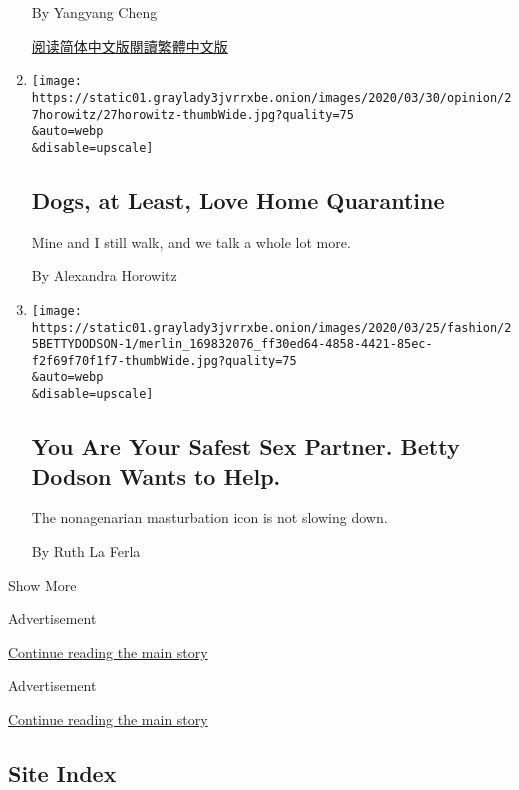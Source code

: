 \begin{enumerate}
  By Yangyang Cheng

  \href{https://cn.nytimes3xbfgragh.onion/opinion/20200410/coronavirus-china-us/}{阅读简体中文版}\href{https://cn.nytimes3xbfgragh.onion/opinion/20200410/coronavirus-china-us/zh-hant/}{閱讀繁體中文版}
\item
  \href{/2020/03/27/opinion/coronavirus-dogs.html}{}

  \texttt{[image: https://static01.graylady3jvrrxbe.onion/images/2020/03/30/opinion/27horowitz/27horowitz-thumbWide.jpg?quality=75\\\&auto=webp\\\&disable=upscale]}

  \hypertarget{dogs-at-least-love-home-quarantine}{%
  \subsection{Dogs, at Least, Love Home
  Quarantine}\label{dogs-at-least-love-home-quarantine}}

  Mine and I still walk, and we talk a whole lot more.

  By Alexandra Horowitz
\item
  \href{/2020/03/26/style/self-care/betty-dodson-masturbation.html}{}

  \texttt{[image: https://static01.graylady3jvrrxbe.onion/images/2020/03/25/fashion/25BETTYDODSON-1/merlin\_169832076\_ff30ed64-4858-4421-85ec-f2f69f70f1f7-thumbWide.jpg?quality=75\\\&auto=webp\\\&disable=upscale]}

  \hypertarget{you-are-your-safest-sex-partner-betty-dodson-wants-to-help}{%
  \subsection{You Are Your Safest Sex Partner. Betty Dodson Wants to
  Help.}\label{you-are-your-safest-sex-partner-betty-dodson-wants-to-help}}

  The nonagenarian masturbation icon is not slowing down.

  By Ruth La Ferla
\end{enumerate}

Show More

Advertisement

\protect\hyperlink{after-mid1}{Continue reading the main story}

Advertisement

\protect\hyperlink{after-mktg}{Continue reading the main story}

\hypertarget{site-index}{%
\subsection{Site Index}\label{site-index}}


